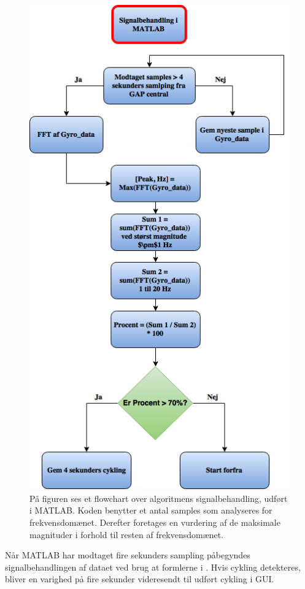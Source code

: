 \begin{figure}[H]
	\centering
	\includegraphics[scale=0.4]{figures/cDesign/algoritme_matlab_cykling.png}
	\caption{På figuren ses et flowchart over algoritmens signalbehandling, udført i MATLAB. Koden benytter et antal samples som analyseres for frekvensdomænet. Derefter foretages en vurdering af de maksimale magnituder i forhold til resten af frekvensdomænet.}
	\label{fig:matlab_cykling}
\end{figure} 
Når MATLAB har modtaget fire sekunders sampling påbegyndes signalbehandlingen af dataet ved brug at formlerne i . Hvis cykling detekteres, bliver en varighed på fire sekunder videresendt til udført cykling i GUI. 

